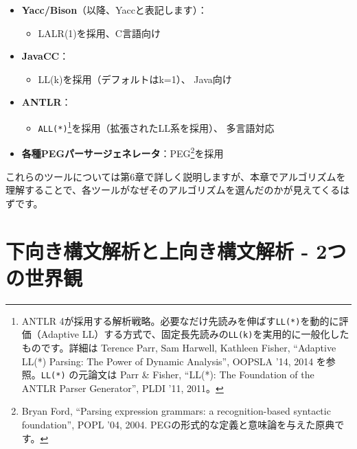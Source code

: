 \begin{itemize}
\tightlist
\item
  \textbf{Yacc/Bison}（以降、Yaccと表記します）：

  \begin{itemize}
  \tightlist
  \item
    LALR(1)を採用、C言語向け
  \end{itemize}
\item
  \textbf{JavaCC}：

  \begin{itemize}
  \tightlist
  \item
    LL(k)を採用（デフォルトはk=1）、 Java向け
  \end{itemize}
\item
  \textbf{ANTLR}：

  \begin{itemize}
  \tightlist
  \item
    \texttt{ALL(*)}\footnote{ANTLR
      4が採用する解析戦略。必要なだけ先読みを伸ばす\texttt{LL(*)}を動的に評価（Adaptive
      LL）する方式で、固定長先読みの\texttt{LL(k)}を実用的に一般化したものです。詳細は
      Terence Parr, Sam Harwell, Kathleen Fisher, ``Adaptive LL(*)
      Parsing: The Power of Dynamic Analysis'', OOPSLA '14, 2014
      を参照。\texttt{LL(*)} の元論文は Parr \& Fisher, ``LL(*): The
      Foundation of the ANTLR Parser Generator'', PLDI '11, 2011。}を採用（拡張されたLL系を採用）、 多言語対応
  \end{itemize}
\item
  \textbf{各種PEGパーサージェネレータ}：PEG\footnote{Bryan Ford, ``Parsing
    expression grammars: a recognition-based syntactic foundation'',
    POPL '04, 2004. PEGの形式的な定義と意味論を与えた原典です。}を採用
\end{itemize}

これらのツールについては第6章で詳しく説明しますが、本章でアルゴリズムを理解することで、各ツールがなぜそのアルゴリズムを選んだのかが見えてくるはずです。

\hypertarget{chapter5-ux4e0bux5411ux304dux69cbux6587ux89e3ux6790ux3068ux4e0aux5411ux304dux69cbux6587ux89e3ux6790---2ux3064ux306eux4e16ux754cux89b3}{%
\section{下向き構文解析と上向き構文解析 -
2つの世界観}\label{chapter5-ux4e0bux5411ux304dux69cbux6587ux89e3ux6790ux3068ux4e0aux5411ux304dux69cbux6587ux89e3ux6790---2ux3064ux306eux4e16ux754cux89b3}}

